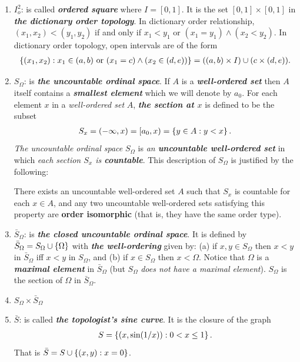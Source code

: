 \documentclass[11pt]{article}
\begin{document}
\begin{enumerate}
\item $I_o^2$: is called \emph{\textbf{ordered square}} where $I = [0,1]$. It is the set $[0,1] \times [0,1]$ in \emph{\textbf{the dictionary order topology}}. In dictionary order relationship, $(x_1, x_2) < (y_1, y_2)$ if and only if $x_1 < y_1$ or $(x_1 = y_1) \land (x_2 < y_2)$. In dictionary order topology, open intervals are of the form 
\begin{align*}
\left\{(x_1, x_2): x_1 \in (a, b) \text{ or } (x_1 = c) \land (x_2 \in (d, e))\right\} = ((a, b) \times I) \cup (c \times (d, e)).
\end{align*}

\item $S_{\Omega}$: is \emph{\textbf{the uncountable ordinal space}}. If $A$ is a \emph{\textbf{well-ordered set}} then $A$ itself contains a \emph{\textbf{smallest element}} which we will denote by $a_0$. For each element $x$ in a \emph{well-ordered set} $A$, \emph{\textbf{the section at $x$}} is defined to be the subset
\begin{align*}
S_x = (-\infty, x) = [a_0, x) = \left\{y \in A:  y < x\right\}.
\end{align*} \emph{The uncountable ordinal space} $S_{\Omega}$ is \emph{an \textbf{uncountable well-ordered set}} in which \emph{each
section $S_x$ is \textbf{countable}}. This description of $S_{\Omega}$  is justified by the following:
\begin{lemma}
There exists an uncountable well-ordered set $A$ such that $S_x$ is countable for each $x \in A$, and any two uncountable well-ordered sets satisfying this property are \textbf{order isomorphic} (that is, they have the same order type).
\end{lemma}

\item $\bar{S}_{\Omega}$:  is \emph{\textbf{the closed uncountable ordinal space}}. It is defined by $\bar{S}_{\Omega} = S_{\Omega} \cup \left\{\Omega\right\}$ with \emph{\textbf{the well-ordering}} given by: (a) if $x, y \in S_{\Omega}$ then $x < y$ in $\bar{S}_{\Omega}$ iff $x < y$ in $S_{\Omega}$, and (b) if $x \in S_{\Omega}$ then $x < \Omega$. Notice that $ \Omega$ is a \emph{\textbf{maximal element}} in $\bar{S}_{\Omega}$ (but $S_{\Omega}$ \emph{does not have a maximal element}). $S_{\Omega}$ is the section of $\Omega$ in $\bar{S}_{\Omega}$.

\item $S_{\Omega} \times \bar{S}_{\Omega}$

\item $\bar{S}$: is called  \emph{\textbf{the topologist's sine curve}}. It is the closure of the graph
\begin{align*}
S = \left\{(x, \sin(1/x)): 0 < x \le 1\right\}.
\end{align*} That is $\bar{S} = S \cup \left\{(x,y): x=0\right\}$.

\end{enumerate}

\newpage


\end{document}
